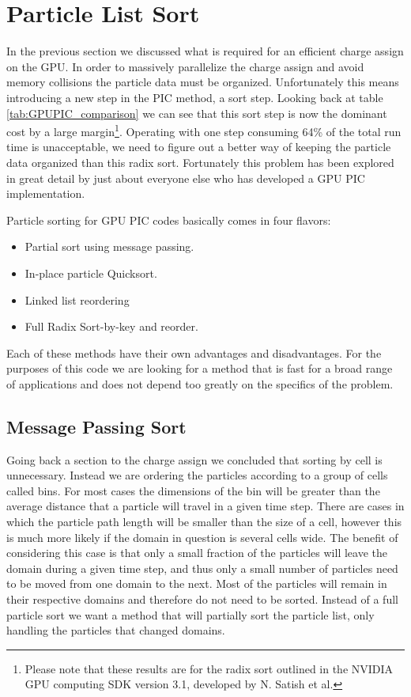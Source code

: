 	\section{Particle List Sort}
		In the previous section we discussed what is required for an efficient charge assign on the GPU. In order to massively parallelize the charge assign and avoid memory collisions the particle data must be organized. Unfortunately this means introducing a new step in the PIC method, a sort step. Looking back at table \ref{tab:GPUPIC_comparison} we can see that this sort step is now the dominant cost by a large margin\footnote{Please note that these results are for the radix sort outlined in the NVIDIA GPU computing SDK version 3.1, developed by N. Satish et al.\cite{Satish2009}}. Operating with one step consuming 64\% of the total run time is unacceptable, we need to figure out a better way of keeping the particle data organized than this radix sort. Fortunately this problem has been explored in great detail by just about everyone else who has developed a GPU PIC implementation. 

Particle sorting for GPU PIC codes basically comes in four flavors:
\begin{itemize}
\item Partial sort using message passing. \cite{Kong2011}\cite{Decyk2011}
\item In-place particle Quicksort. \cite{Stantchev2008}
\item Linked list reordering \cite{Burau2010}
\item Full Radix Sort-by-key and reorder. \cite{Abreu2011}
\end{itemize}
Each of these methods have their own advantages and disadvantages. For the purposes of this code we are looking for a method that is fast for a broad range of applications and does not depend too greatly on the specifics of the problem.



	\subsection{Message Passing Sort}
	Going back a section to the charge assign we concluded that sorting by cell is unnecessary. Instead we are ordering the particles according to a group of cells called bins. For most cases the dimensions of the bin will be greater than the average distance that a particle will travel in a given time step. There are cases in which the particle path length will be smaller than the size of a cell, however this is much more likely if the domain in question is several cells wide. The benefit of considering this case is that only a small fraction of the particles will leave the domain during a given time step, and thus only a small number of particles need to be moved from one domain to the next. Most of the particles will remain in their respective domains and therefore do not need to be sorted. Instead of a full particle sort we want a method that will partially sort the particle list, only handling the particles that changed domains. 

